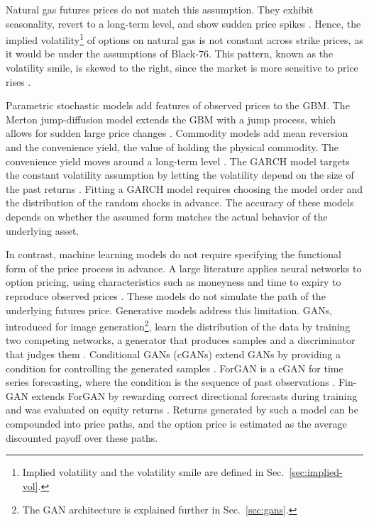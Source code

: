 Natural gas futures prices do not match this assumption. They exhibit seasonality, revert to a long-term level, and show sudden price spikes \parencite[244]{gemanCommoditiesCommodityDerivatives2005}. Hence, the implied volatility\footnote{Implied volatility and the volatility smile
are defined in Sec.~\ref{sec:implied-vol}.} of options on natural gas is not constant across strike prices, as it would be under the assumptions of Black-76. This pattern, known as the volatility smile, is skewed to the right, since the market is more sensitive to price rises \parencite[101--105]{gemanCommoditiesCommodityDerivatives2005}. 

Parametric stochastic models add features of observed prices to the GBM. The Merton jump-diffusion model extends the GBM with a jump process, which allows for sudden large price changes \parencite{mertonOptionPricingWhen1976}. Commodity models add mean reversion \parencite{schwartzStochasticBehaviorCommodity1997} and the convenience yield, the value of holding the physical commodity. The convenience yield moves around a long-term level \parencite{gibsonStochasticConvenienceYield1990}. The GARCH model targets the constant volatility assumption by letting the volatility depend on the size of the past returns \parencite{bollerslevGeneralizedAutoregressiveConditional1986}. Fitting a GARCH model requires choosing the model order and the distribution of the random shocks in advance. The accuracy of these models depends on whether the assumed form matches the actual behavior of the underlying asset. 

In contrast, machine learning models do not require specifying the functional form of the price process in advance. A large literature applies neural networks to option pricing, using characteristics such as moneyness and time to expiry to reproduce observed prices \parencite{rufNeuralNetworksOption2019}. These models do not simulate the path of the underlying futures price. Generative models address this limitation. GANs, introduced for image generation\footnote{The GAN architecture is explained further in Sec.~\ref{sec:gans}.}, learn the distribution of the data by training two competing networks, a generator that produces samples and a discriminator that judges them \parencite{goodfellowGenerativeAdversarialNetworks2014}. Conditional GANs (cGANs) extend GANs by providing a condition for controlling the generated samples \parencite{mirzaConditionalGenerativeAdversarial2014}. ForGAN is a cGAN for time series forecasting, where the condition is the sequence of past observations \parencite{koochaliProbabilisticForecastingSensory2019}. Fin-GAN extends ForGAN by rewarding correct directional forecasts during training and was evaluated on equity returns \parencite{vuleticFinGANForecastingClassifying2024}. Returns generated by such a model can be compounded into price paths, and the option price is estimated as the average discounted payoff over these paths.

